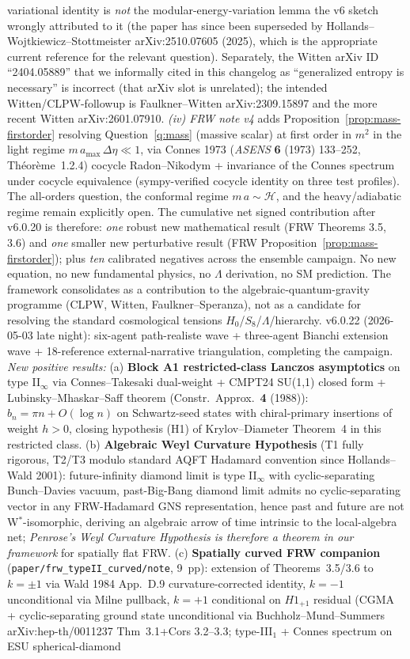 \documentclass[reprint,amsmath,amssymb,aps,prd,superscriptaddress]{revtex4-2}
\providecommand{\1}{\mathbf{1}}
\begin{document}
variational identity is \emph{not} the modular-energy-variation lemma the v6 sketch wrongly attributed to it (the paper has since been superseded by Hollands--Wojtkiewicz--Stottmeister arXiv:2510.07605 (2025), which is the appropriate current reference for the relevant question). Separately, the Witten arXiv ID ``2404.05889'' that we informally cited in this changelog as ``generalized entropy is necessary'' is incorrect (that arXiv slot is unrelated); the intended Witten/CLPW-followup is Faulkner--Witten arXiv:2309.15897 and the more recent Witten arXiv:2601.07910. \emph{(iv) FRW note v4} adds Proposition~\ref{prop:mass-firstorder} resolving Question~\ref{q:mass} (massive scalar) at first order in $m^2$ in the light regime $m\,a_{\max}\,\Delta\eta \ll 1$, via Connes 1973 (\emph{ASENS} \textbf{6} (1973) 133--252, Th\'eor\`eme~1.2.4) cocycle Radon--Nikodym + invariance of the Connes spectrum under cocycle equivalence (sympy-verified cocycle identity on three test profiles). The all-orders question, the conformal regime $m\,a\sim\mathcal{H}$, and the heavy/adiabatic regime remain explicitly open. The cumulative net signed contribution after v6.0.20 is therefore: \emph{one} robust new mathematical result (FRW Theorems 3.5, 3.6) and \emph{one} smaller new perturbative result (FRW Proposition~\ref{prop:mass-firstorder}); plus \emph{ten} calibrated negatives across the ensemble campaign. No new equation, no new fundamental physics, no $\Lambda$ derivation, no SM prediction. The framework consolidates as a contribution to the algebraic-quantum-gravity programme (CLPW, Witten, Faulkner--Speranza), not as a candidate for resolving the standard cosmological tensions $H_0$/$S_8$/$\Lambda$/hierarchy. v6.0.22 (2026-05-03 late night): six-agent path-realiste wave + three-agent Bianchi extension wave + 18-reference external-narrative triangulation, completing the campaign. \emph{New positive results:} (a) \textbf{Block A1 restricted-class Lanczos asymptotics} on type II$_\infty$ via Connes--Takesaki dual-weight + CMPT24 SU(1,1) closed form + Lubinsky--Mhaskar--Saff theorem (Constr.~Approx.~\textbf{4} (1988)): $b_n = \pi n + O(\log n)$ on Schwartz-seed states with chiral-primary insertions of weight $h>0$, closing hypothesis (H1) of Krylov--Diameter Theorem~4 in this restricted class. (b) \textbf{Algebraic Weyl Curvature Hypothesis} (T1 fully rigorous, T2/T3 modulo standard AQFT Hadamard convention since Hollands--Wald 2001): future-infinity diamond limit is type II$_\infty$ with cyclic-separating Bunch--Davies vacuum, past-Big-Bang diamond limit admits no cyclic-separating vector in any FRW-Hadamard GNS representation, hence past and future are not W$^*$-isomorphic, deriving an algebraic arrow of time intrinsic to the local-algebra net; \emph{Penrose's Weyl Curvature Hypothesis is therefore a theorem in our framework} for spatially flat FRW. (c) \textbf{Spatially curved FRW companion} (\texttt{paper/frw\_typeII\_curved/note}, 9~pp): extension of Theorems~3.5/3.6 to $k=\pm 1$ via Wald 1984 App.~D.9 curvature-corrected identity, $k=-1$ unconditional via Milne pullback, $k=+1$ conditional on $H1_{+1}$ residual (CGMA + cyclic-separating ground state unconditional via Buchholz--Mund--Summers arXiv:hep-th/0011237 Thm~3.1+Cors 3.2--3.3; type-III$_1$ + Connes spectrum on ESU spherical-diamond 
\end{document}

